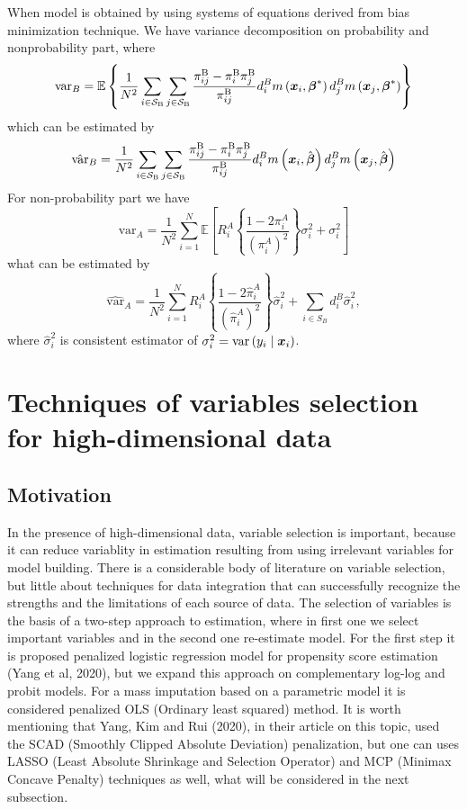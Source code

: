 \documentclass[
  letterpaper,
  DIV=11,
  numbers=noendperiod]{scrreprt}
\begin{document}
When model is obtained by using systems of equations derived from bias
minimization technique. We have variance decomposition on probability
and nonprobability part, where \[
\text{var}_B = \mathbb{E} \left\{\frac{1}{N^2} \sum_{i \in \mathcal{S}_{\mathrm{B}}} \sum_{j \in \mathcal{S}_{\mathrm{B}}} \frac{\pi_{i j}^{\mathrm{B}}-\pi_i^{\mathrm{B}} \pi_j^{\mathrm{B}}}{\pi_{i j}^{\mathrm{B}}} d_i^B m\left(\boldsymbol{x}_i, \boldsymbol{\beta}^*\right) d_j^B m\left(\boldsymbol{x}_j, \boldsymbol{\beta}^*\right) \right\}
\] which can be estimated by \[
\hat{\text{var}}_B = \frac{1}{N^2} \sum_{i \in \mathcal{S}_{\mathrm{B}}} \sum_{j \in \mathcal{S}_{\mathrm{B}}} \frac{\pi_{i j}^{\mathrm{B}}-\pi_i^{\mathrm{B}} \pi_j^{\mathrm{B}}}{\pi_{i j}^{\mathrm{B}}} d_i^B m\left(\boldsymbol{x}_i, \hat{\boldsymbol{\beta}}\right) d_j^B m\left(\boldsymbol{x}_j, \hat{\boldsymbol{\beta}}\right)
\] For non-probability part we have \[
\text{var}_A = \frac{1}{N^2} \sum_{i=1}^N \mathbb{E} \left[R_i^A \left\{ \frac{1 - 2 \pi_i^A}{\left( \pi_i^A \right) ^2} \right\} \sigma_i^2 + \sigma_i^2 \right]
\] what can be estimated by \[
\hat{\text{var}}_A = \frac{1}{N^2} \sum_{i=1}^N R_i^A \left\{ \frac{1 - 2 \hat{\pi}_i^A}{\left( \hat{\pi}_i^A \right) ^2} \right\} \hat{\sigma}_i^2 + \sum_{i \in S_B} d_i^B \hat{\sigma}_i^2,
\] where \(\hat{\sigma}_i^2\) is consistent estimator of
\(\sigma_i^2 = \text{var}\left(y_i \mid \boldsymbol{x}_i\right)\).


\chapter{Techniques of variables selection for high-dimensional
data}\label{techniques-of-variables-selection-for-high-dimensional-data}

\section{Motivation}\label{motivation}

In the presence of high-dimensional data, variable selection is
important, because it can reduce variablity in estimation resulting from
using irrelevant variables for model building. There is a considerable
body of literature on variable selection, but little about techniques
for data integration that can successfully recognize the strengths and
the limitations of each source of data. The selection of variables is
the basis of a two-step approach to estimation, where in first one we
select important variables and in the second one re-estimate model. For
the first step it is proposed penalized logistic regression model for
propensity score estimation (Yang et al, 2020), but we expand this
approach on complementary log-log and probit models. For a mass
imputation based on a parametric model it is considered penalized OLS
(Ordinary least squared) method. It is worth mentioning that Yang, Kim
and Rui (2020), in their article on this topic, used the SCAD (Smoothly
Clipped Absolute Deviation) penalization, but one can uses LASSO (Least
Absolute Shrinkage and Selection Operator) and MCP (Minimax Concave
Penalty) techniques as well, what will be considered in the next
subsection.
\end{document}
